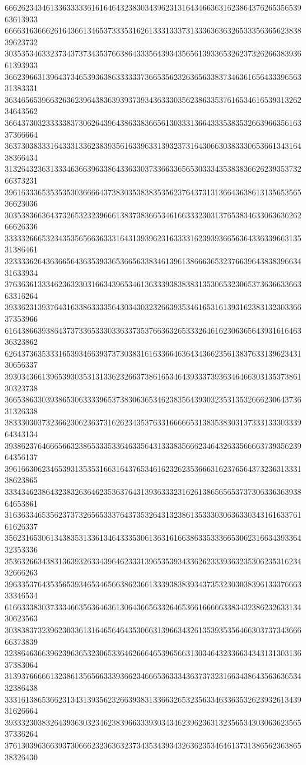 66626234346133633333616164643238303439623131643466363162386437626535653963613933
66663163666261643661346537333531626133313337313336363632653335636562383839623732
30353534633237343737343537663864333564393435656139336532623732626638393661393933
36623966313964373465393638633333373665356232636563383734636165643339656331383331
36346565396632636239643836393937393436333035623863353761653461653931326234643562
36643730323333383730626439643863383665613033313664333538353266396635616337366664
36373038333164333133623839356163396331393237316430663038333065366134316438366434
31326432363133346366396338643363303733663365653033343538383662623935373266373231
39616333653535353036666437383035383835356237643731313664363861313565356536623036
30353836636437326532323966613837383665346166333230313765383463306363626266626336
33333266653234353565663633316431393962316333316239393665636433633966313531386461
32333362643636656436353933653665633834613961386663653237663964383839663431633934
37636361333462363230316634396534613633393838383135306532306537363663366363316264
39336231393764316338633335643034303232663935346165316139316238313230336637353966
61643866393864373733653330336337353766363265333264616230636564393161646336323862
62643736353331653934663937373038316163366463643436623561383763313962343130656337
39303436613965393035313133623266373861653464393337393634646630313537386130323738
36653863303938653063333965373830636534623835643930323531353266623064373631326338
38333030373236623062363731626234353763316666653138353830313733313330333964343134
39386237646665663238653335336463356431333835666234643263356666373935623964356137
39616630623465393135353166316437653461623262353666316237656437323631333138623865
33343462386432383263646235363764313936333231626138656565373730633636393864653861
31636334653562373732656533376437353264313238613533303063633034316163376161626337
35623165306134383531336134643335306136316166386335333665306231663439336432353336
35363266343831363932633439646233313965353934336262333936323530623531623432666263
39633537643535653934653465663862366133393838393437353230303839613337666333346534
61663338303733346635636463613064366563326465366166666338343238623263313430623563
30383837323962303361316465646435306631396634326135393535646630373734366666373839
32386463663962396365323065336462666465396566313034643233663434313130313637383064
31393766666132386135656633393662346665363334363737323166343864356363653432386438
33316138653662313431393562326639383133663265323563346336353262393261343931626664
39333230383264393630323462383966333930343462396236313235653430306362356537336264
37613039636639373066623236363237343534393432636235346461373138656236386538326430
